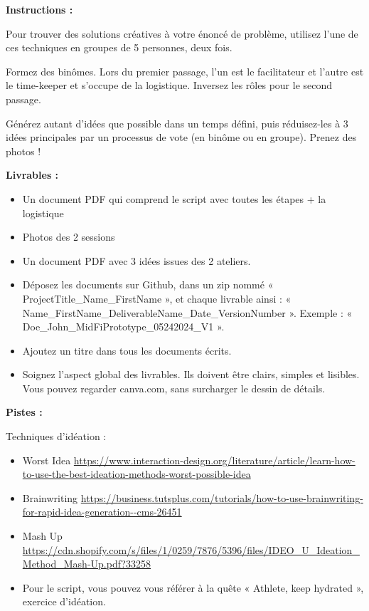 \makeheaderfiles

\textbf{Instructions :}

Pour trouver des solutions créatives à votre énoncé de problème, utilisez l'une de ces techniques en groupes de 5 personnes, deux fois.

Formez des binômes. Lors du premier passage, l'un est le facilitateur et l'autre est le time-keeper et s'occupe de la logistique. Inversez les rôles pour le second passage.

Générez autant d'idées que possible dans un temps défini, puis réduisez-les à 3 idées principales par un processus de vote (en binôme ou en groupe). Prenez des photos !

\textbf{Livrables :}

\begin{itemize}
\item Un document PDF qui comprend le script avec toutes les étapes + la logistique
\item Photos des 2 sessions
\item Un document PDF avec 3 idées issues des 2 ateliers.
\item Déposez les documents sur Github, dans un zip nommé « ProjectTitle\_Name\_FirstName », et chaque livrable ainsi : « Name\_FirstName\_DeliverableName\_Date\_VersionNumber ». Exemple : « Doe\_John\_MidFiPrototype\_05242024\_V1 ».
\item Ajoutez un titre dans tous les documents écrits.
\item Soignez l'aspect global des livrables. Ils doivent être clairs, simples et lisibles. Vous pouvez regarder canva.com, sans surcharger le dessin de détails.
\end{itemize}

\textbf{Pistes :}

Techniques d'idéation :

\begin{itemize}
\item Worst Idea \url{https://www.interaction-design.org/literature/article/learn-how-to-use-the-best-ideation-methods-worst-possible-idea}
\item Brainwriting \url{https://business.tutsplus.com/tutorials/how-to-use-brainwriting-for-rapid-idea-generation--cms-26451}
\item Mash Up \url{https://cdn.shopify.com/s/files/1/0259/7876/5396/files/IDEO_U_Ideation_Method_Mash-Up.pdf?33258}
\item Pour le script, vous pouvez vous référer à la quête « Athlete, keep hydrated », exercice d'idéation.
\end{itemize}

